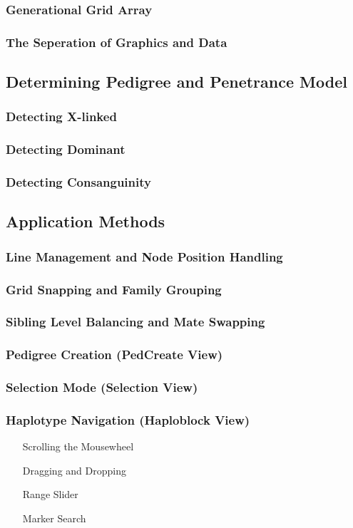 \subsubsection{Generational Grid Array}
\subsubsection{The Seperation of Graphics and Data}

\subsection{Determining Pedigree and Penetrance Model}
\subsubsection{Detecting X-linked}
\subsubsection{Detecting Dominant}
\subsubsection{Detecting Consanguinity}

\subsection{Application Methods}
\subsubsection{Line Management and Node Position Handling}
\subsubsection{Grid Snapping and Family Grouping}
\subsubsection{Sibling Level Balancing and Mate Swapping}
\subsubsection{Pedigree Creation (PedCreate View)}
\subsubsection{Selection Mode (Selection View)}
\subsubsection{Haplotype Navigation (Haploblock View)}
\begin{enumerate}
\item[Scrolling the Mousewheel]{}
\item[Dragging and Dropping]{}
\item[Range Slider]{}
\item[Marker Search]{}
\end{enumerate}

